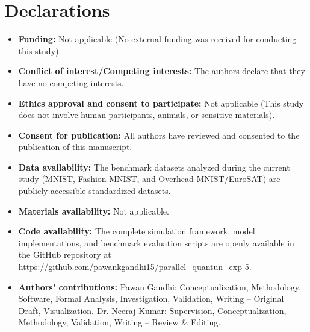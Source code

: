 \documentclass[pdflatex,sn-mathphys-num]{sn-jnl}%
\theoremstyle{thmstyleone}%
\theoremstyle{thmstyletwo}%
\theoremstyle{thmstylethree}%
\begin{document}
\section*{Declarations}

\begin{itemize}
\item \textbf{Funding:} Not applicable (No external funding was received for conducting this study).
\item \textbf{Conflict of interest/Competing interests:} The authors declare that they have no competing interests.
\item \textbf{Ethics approval and consent to participate:} Not applicable (This study does not involve human participants, animals, or sensitive materials).
\item \textbf{Consent for publication:} All authors have reviewed and consented to the publication of this manuscript.
\item \textbf{Data availability:} The benchmark datasets analyzed during the current study (MNIST, Fashion-MNIST, and Overhead-MNIST/EuroSAT) are publicly accessible standardized datasets.
\item \textbf{Materials availability:} Not applicable.
\item \textbf{Code availability:} The complete simulation framework, model implementations, and benchmark evaluation scripts are openly available in the GitHub repository at \url{https://github.com/pawankgandhi15/parallel_quantun_exp-5}.
\item \textbf{Authors' contributions:} Pawan Gandhi: Conceptualization, Methodology, Software, Formal Analysis, Investigation, Validation, Writing -- Original Draft, Visualization. Dr. Neeraj Kumar: Supervision, Conceptualization, Methodology, Validation, Writing -- Review \& Editing.
\end{itemize}
\end{document}
